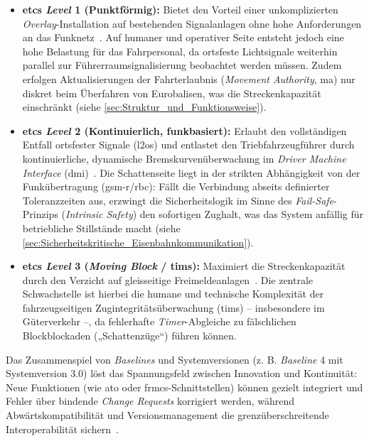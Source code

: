 \documentclass[runningheads]{res/llncs}
\begin{document}
\begin{itemize}
    \item \textbf{\gls{etcs} \textit{Level} 1 (Punktförmig):} Bietet den Vorteil einer unkomplizierten \textit{Overlay}-Installation auf bestehenden Signalanlagen ohne hohe Anforderungen an das Funknetz~\parencite[S. 71]{trinckaufETCS2024}. Auf humaner und operativer Seite entsteht jedoch eine hohe Belastung für das Fahrpersonal, da ortsfeste Lichtsignale weiterhin parallel zur Führerraumsignalisierung beobachtet werden müssen. Zudem erfolgen Aktualisierungen der Fahrterlaubnis (\textit{Movement Authority}, \gls{ma}) nur diskret beim Überfahren von Eurobalisen, was die Streckenkapazität einschränkt (siehe \autoref{sec:Struktur_und_Funktionsweise}).
    \item \textbf{\gls{etcs} \textit{Level} 2 (Kontinuierlich, funkbasiert):} Erlaubt den vollständigen Entfall ortsfester Signale (\gls{l2os}) und entlastet den Triebfahrzeugführer durch kontinuierliche, dynamische Bremskurvenüberwachung im \textit{Driver Machine Interface} (\gls{dmi})~\parencite[S. 89--90]{trinckaufETCS2024}. Die Schattenseite liegt in der strikten Abhängigkeit von der Funkübertragung (\gls{gsm-r}/\gls{rbc}): Fällt die Verbindung abseits definierter Toleranzzeiten aus, erzwingt die Sicherheitslogik im Sinne des \textit{Fail-Safe}-Prinzips (\textit{Intrinsic Safety}) den sofortigen Zughalt, was das System anfällig für betriebliche Stillstände macht (siehe \autoref{sec:Sicherheitskritische_Eisenbahnkommunikation}).
    \item \textbf{\gls{etcs} \textit{Level} 3 (\textit{Moving Block} / \gls{tims}):} Maximiert die Streckenkapazität durch den Verzicht auf gleisseitige Freimeldeanlagen~\parencite[S. 471--472]{trinckaufETCS2024}. Die zentrale Schwachstelle ist hierbei die humane und technische Komplexität der fahrzeugseitigen Zugintegritätsüberwachung (\gls{tims}) – insbesondere im Güterverkehr –, da fehlerhafte \textit{Timer}-Abgleiche zu fälschlichen Blockblockaden („Schattenzüge“) führen können.
\end{itemize}

Das Zusammenspiel von \textit{Baselines} und Systemversionen (z. B. \textit{Baseline} 4 mit Systemversion 3.0) löst das Spannungsfeld zwischen Innovation und Kontinuität: Neue Funktionen (wie \gls{ato} oder \gls{frmcs}-Schnittstellen) können gezielt integriert und Fehler über bindende \textit{Change Requests} korrigiert werden, während Abwärtskompatibilität und Versionsmanagement die grenzüberschreitende Interoperabilität sichern~\parencite[S. 53, 218--220]{trinckaufETCS2024}.
\end{document}
